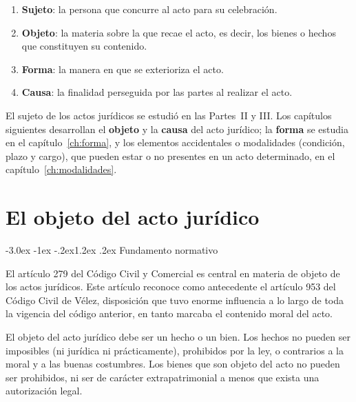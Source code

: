 \documentclass[12pt,oneside]{book}
\makeatletter
\renewcommand\section{\@startsection{section}{1}{\z@}%
  {-3.0ex \@plus -1ex \@minus -.2ex}{1.2ex \@plus .2ex}%
  {\normalfont\large\bfseries\color{acento}}}
\makeatother
\begin{document}
\begin{enumerate}
    \item \textbf{Sujeto}: la persona que concurre al acto para su celebración.
    \item \textbf{Objeto}: la materia sobre la que recae el acto, es decir, los bienes o hechos que constituyen su contenido.
    \item \textbf{Forma}: la manera en que se exterioriza el acto.
    \item \textbf{Causa}: la finalidad perseguida por las partes al realizar el acto.
\end{enumerate}


El sujeto de los actos jurídicos se estudió en las Partes~II y III. Los capítulos siguientes desarrollan el \textbf{objeto} y la \textbf{causa} del acto jurídico; la \textbf{forma} se estudia en el capítulo~\ref{ch:forma}, y los elementos accidentales o modalidades (condición, plazo y cargo), que pueden estar o no presentes en un acto determinado, en el capítulo~\ref{ch:modalidades}.

\chapter{El objeto del acto jurídico}
\section{Fundamento normativo}

El artículo 279 del Código Civil y Comercial es central en materia de objeto de los actos jurídicos. Este artículo reconoce como antecedente el artículo 953 del Código Civil de Vélez, disposición que tuvo enorme influencia a lo largo de toda la vigencia del código anterior, en tanto marcaba el contenido moral del acto.

\begin{definicion}
El objeto del acto jurídico debe ser un hecho o un bien. Los hechos no pueden ser imposibles (ni jurídica ni prácticamente), prohibidos por la ley, o contrarios a la moral y a las buenas costumbres. Los bienes que son objeto del acto no pueden ser prohibidos, ni ser de carácter extrapatrimonial a menos que exista una autorización legal.
\end{definicion}
\end{document}
